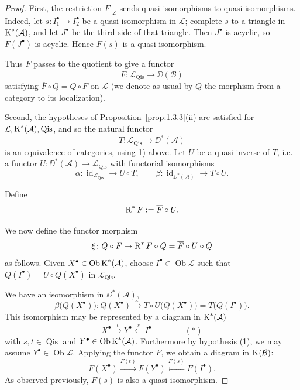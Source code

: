 \begin{proof}
First, the restriction $F|_{\mathcal{L}}$ sends quasi-isomorphisms to quasi-isomorphisms. Indeed, let $s\colon I_1^\bullet\to I_2^\bullet$ be a quasi-isomorphism in $\mathcal{L}$; complete $s$ to a triangle in $\operatorname{K}^*(\mathcal{A})$, and let $J^\bullet$ be
the third side of that triangle. Then $J^\bullet$  is acyclic, so $F(J^\bullet)$ is acyclic. Hence $F(s)$ is a quasi-isomorphism.

Thus $F$ passes to the quotient to give a functor
\[
\overline{F}\colon\mathcal{L}_{\operatorname{Qis}} \to \DD(\mathcal{B})
\]
satisfying $\overline{F}\circ Q = Q\circ F$ on $\mathcal{L}$ (we denote as usual by $Q$
the morphism from a category to its localization).

Second, the hypotheses of Proposition~\ref{prop:1.3.3}(ii) are satisfied for $\mathcal{L},\operatorname{K}^*(\mathcal{A}),\operatorname{Qis}$, and so the natural functor
\[
T\colon\mathcal{L}_{\operatorname{Qis}} \to \DD^*(\mathcal{A})
\]
is an equivalence of categories, using 1) above. Let $U$ be a quasi-inverse of $T$, i.e. a functor $U\colon\DD^*(\mathcal{A})\to\mathcal{L}_{\operatorname{Qis}}$ with functorial isomorphisms
\[
\alpha\colon \operatorname{id}_{\mathcal{L}_{\operatorname{Qis}}} \to U\circ T,\qquad
\beta\colon \operatorname{id}_{\DD^*(\mathcal{A})} \to T\circ U.
\]

Define
\[
\operatorname{R}^*F := \overline{F}\circ U.
\]

We now define the functor morphism
\[
\xi\colon Q\circ F \to \operatorname{R}^*F\circ Q = \overline{F}\circ U\circ Q
\]
as follows. Given $X^\bullet\in\operatorname{Ob}\operatorname{K}^*(\mathcal{A})$, choose $I^\bullet\in\operatorname{Ob}\mathcal{L}$ such that $Q(I^\bullet)=U\circ Q(X^\bullet)$ in $\mathcal{L}_{\operatorname{Qis}}$.

We have an isomorphism in $\DD^*(\mathcal{A})$,
\[
\beta\big(Q(X^\bullet)\big)\colon Q(X^\bullet) \stackrel{\sim}{\longrightarrow}
T\circ U\big(Q(X^\bullet)\big) = T\big(Q(I^\bullet)\big).
\]
This isomorphism may be represented by a diagram in $\operatorname{K}^*(\mathcal{A})$
\[
X^\bullet \xrightarrow{t} Y^\bullet \xleftarrow{s} I^\bullet
\quad \quad \quad \quad (*)\]
with $s,t\in\operatorname{Qis}$ and $Y^\bullet\in\operatorname{Ob}\operatorname{K}^*(\mathcal{A})$. Furthermore by hypothesis (1), we may assume $Y^\bullet\in\operatorname{Ob}\mathcal{L}$. Applying the functor $F$, we obtain a diagram in $\operatorname{K}(\mathcal{B})$:
\[
F(X^\bullet) \xrightarrow{F(t)} F(Y^\bullet)\xleftarrow{F(s)}  F(I^\bullet).
\]
As observed previously, $F(s)$ is also a quasi-isomorphism.


\end{proof}
